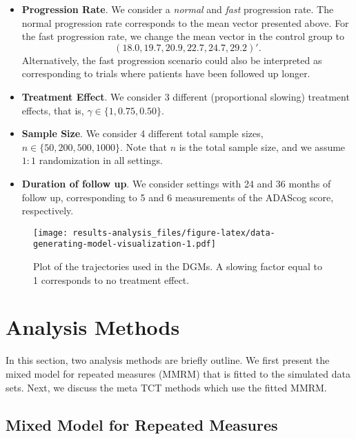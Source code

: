 \documentclass[
]{article}
\providecommand{\tightlist}{%
  \setlength{\itemsep}{0pt}\setlength{\parskip}{0pt}}
\begin{document}
\begin{itemize}
\tightlist
\item
  \textbf{Progression Rate}. We consider a \emph{normal} and \emph{fast} progression rate. The
  normal progression rate corresponds to the mean vector presented above. For the
  fast progression rate, we change the mean vector in the control group to
  \[(18.0, 19.7, 20.9, 22.7, 24.7, 29.2)'.\] Alternatively, the fast progression
  scenario could also be interpreted as corresponding to trials where patients have
  been followed up longer.
\item
  \textbf{Treatment Effect}. We consider 3 different (proportional slowing) treatment
  effects, that is, \(\gamma \in \{1, 0.75, 0.50 \}\).
\item
  \textbf{Sample Size}. We consider 4 different total sample sizes, \(n \in \{50, 200, 500, 1000\}\).
  Note that \(n\) is the total sample size, and we assume \(1:1\) randomization in all settings.
\item
  \textbf{Duration of follow up}. We consider settings with 24 and 36 months of follow up,
  corresponding to 5 and 6 measurements of the ADAScog score, respectively.
\end{itemize}

\begin{figure}
\centering
\texttt{[image: results-analysis\_files/figure-latex/data-generating-model-visualization-1.pdf]}
\caption{\label{fig:data-generating-model-visualization}Plot of the trajectories used in the DGMs. A slowing factor equal to 1 corresponds to no treatment effect.}
\end{figure}

\hypertarget{analysis-methods}{%
\section{Analysis Methods}\label{analysis-methods}}

In this section, two analysis methods are briefly outline. We first present the
mixed model for repeated measures (MMRM) that is fitted to the simulated data sets.
Next, we discuss the meta TCT methods which use the fitted MMRM.

\hypertarget{mixed-model-for-repeated-measures}{%
\subsection{Mixed Model for Repeated Measures}\label{mixed-model-for-repeated-measures}}
\end{document}
